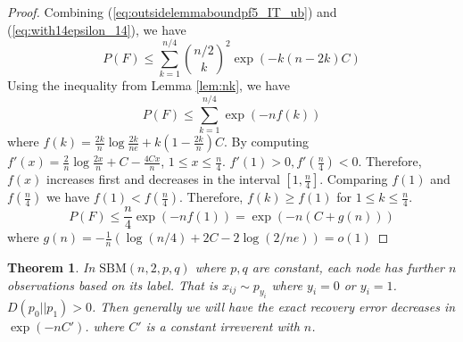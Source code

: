\documentclass{article}
\newtheorem{theorem}{Theorem}
\begin{document}
\begin{proof}
	Combining (\ref{eq:outsidelemmaboundpf5_IT_ub}) and (\ref{eq:with14epsilon_14}), we have
	\begin{equation}
	P(F) \leq \sum_{k=1}^{n/4} \binom{n/2}{k}^2 \exp(-k(n-2k)C)
	\end{equation}
	Using the inequality from Lemma \ref{lem:nk}, we have
	\begin{equation}\label{eq:Ff}
		P(F) \leq \sum_{k=1}^{n/4} \exp(-nf(k))
	\end{equation}
	where $f(k)= \frac{2k}{n}\log\frac{2k}{ne} + k(1-\frac{2k}{n})C$.
	By computing $f'(x)= \frac{2}{n} \log \frac{2x}{n} + C - \frac{4Cx}{n}$, $1\leq x \leq \frac{n}{4}$.
	$f'(1) > 0 , f'(\frac{n}{4}) < 0$. Therefore, $f(x)$ increases first and decreases in the interval $[1, \frac{n}{4}]$.
	Comparing $f(1)$ and $f(\frac{n}{4})$ we have $f(1) < f(\frac{n}{4})$. Therefore, $f(k) \geq f(1)$ for $1\leq k \leq \frac{n}{4}$.
	\begin{equation}
	P(F) \leq \frac{n}{4}\exp(-nf(1)) = \exp(-n (C+g(n)))
	\end{equation}
	where $g(n) = -\frac{1}{n}(\log (n/4) + 2 C - 2 \log (2/ne)) = o(1)$
\end{proof}
\begin{theorem}
	In $\textrm{SBM}(n, 2, p, q)$ where $p,q$ are constant, each node has further $n$ observations based on its label.
	That is $ x_{ij} \sim p_{y_i}$ where $y_i = 0 $ or $y_i = 1$. $D(p_0 || p_1) > 0$. Then generally we will have
	the exact recovery error decreases in $\exp(-nC')$. where $C'$ is a constant irreverent with $n$.
\end{theorem}
\end{document}
